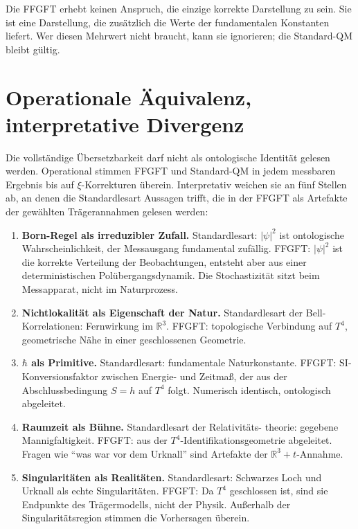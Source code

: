Die FFGFT erhebt keinen Anspruch, die einzige korrekte Darstellung zu
sein. Sie ist eine Darstellung, die zusätzlich die Werte der
fundamentalen Konstanten liefert. Wer diesen Mehrwert nicht braucht,
kann sie ignorieren; die Standard-QM bleibt gültig.

\section{Operationale Äquivalenz, interpretative Divergenz}

Die vollständige Übersetzbarkeit darf nicht als ontologische Identität
gelesen werden. Operational stimmen FFGFT und Standard-QM in jedem
messbaren Ergebnis bis auf $\xi$-Korrekturen überein. Interpretativ
weichen sie an fünf Stellen ab, an denen die Standardlesart Aussagen
trifft, die in der FFGFT als Artefakte der gewählten Trägerannahmen
gelesen werden:

\begin{enumerate}
  \item \textbf{Born-Regel als irreduzibler Zufall.} Standardlesart:
        $|\psi|^2$ ist ontologische Wahrscheinlichkeit, der Messausgang
        fundamental zufällig. FFGFT: $|\psi|^2$ ist die korrekte Verteilung
        der Beobachtungen, entsteht aber aus einer deterministischen
        Polübergangsdynamik. Die Stochastizität sitzt beim Messapparat,
        nicht im Naturprozess.
  \item \textbf{Nichtlokalität als Eigenschaft der Natur.} Standardlesart
        der Bell-Korrelationen: Fernwirkung im $\mathbb{R}^3$. FFGFT:
        topologische Verbindung auf $T^4$, geometrische Nähe in einer
        geschlossenen Geometrie.
  \item \textbf{$\hbar$ als Primitive.} Standardlesart: fundamentale
        Naturkonstante. FFGFT: SI-Konversionsfaktor zwischen Energie- und
        Zeitmaß, der aus der Abschlussbedingung $S = h$ auf $T^4$ folgt.
        Numerisch identisch, ontologisch abgeleitet.
  \item \textbf{Raumzeit als Bühne.} Standardlesart der Relativitäts-
        theorie: gegebene Mannigfaltigkeit. FFGFT: aus der
        $T^4$-Identifikationsgeometrie abgeleitet. Fragen wie
        \enquote{was war vor dem Urknall} sind Artefakte der
        $\mathbb{R}^3\!+\!t$-Annahme.
  \item \textbf{Singularitäten als Realitäten.} Standardlesart: Schwarzes
        Loch und Urknall als echte Singularitäten. FFGFT: Da $T^4$
        geschlossen ist, sind sie Endpunkte des Trägermodells, nicht der
        Physik. Außerhalb der Singularitätsregion stimmen die Vorhersagen
        überein.
\end{enumerate}

